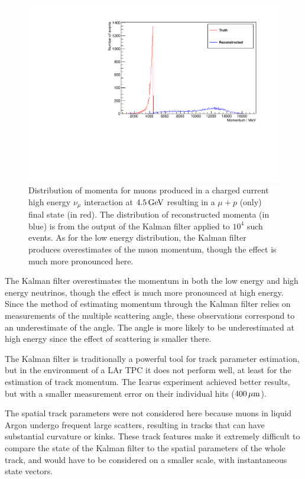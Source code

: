 \begin{figure}
\centering
\includegraphics[angle=-90,width=\textwidth]{chapters/trackfitting_images/kalman-ccqe-high}
\caption[True and reconstructed muon momentum distributions for $E_\nu=4.5\GeV$]{\label{fig:kalman-ccqe-high}Distribution of momenta for muons produced in a charged current high energy $\nu_\mu$ interaction at $4.5\,\mathrm{GeV}$ resulting in a $\mu + p$ (only) final state (in red). The distribution of reconstructed momenta (in blue) is from the output of the Kalman filter applied to $10^4$ such events. As for the low energy distribution, the Kalman filter produces overestimates of the muon momentum, though the effect is much more pronounced here.}
\end{figure}

The Kalman filter overestimates the momentum in both the low energy and high energy neutrinos, though the effect is much more pronounced at high energy. Since the method of estimating momentum through the Kalman filter relies on measurements of the multiple scattering angle, these observations correspond to an underestimate of the angle. The angle is more likely to be underestimated at high energy since the effect of scattering is smaller there.

The Kalman filter is traditionally a powerful tool for track parameter estimation, but in the environment of a \ac{LAr TPC} it does not perform well, at least for the estimation of track momentum. The Icarus experiment achieved better results, but with a smaller measurement error on their individual hits ($400\,\mu\mathrm{m}$)\citep{Ankowski2006}.

The spatial track parameters were not considered here because muons in liquid Argon undergo frequent large scatters, resulting in tracks that can have substantial curvature or kinks. These track features make it extremely difficult to compare the state of the Kalman filter to the spatial parameters of the whole track, and would have to be considered on a smaller scale, with instantaneous state vectors.

